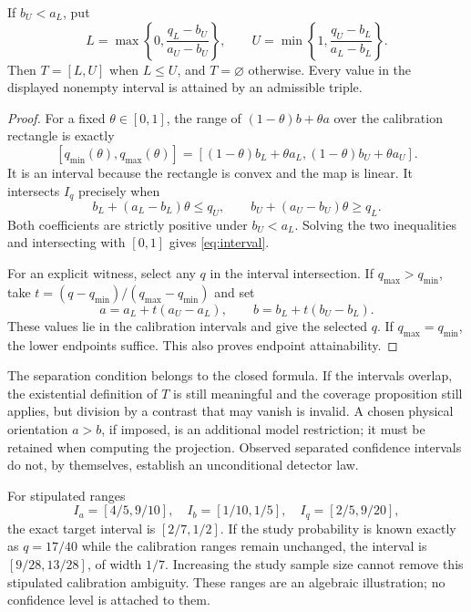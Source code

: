 \documentclass[11pt]{article}
\begin{document}
\begin{theorem}
If $b_U<a_L$, put
\begin{equation}
 L=\max\left\{0,\frac{q_L-b_U}{a_U-b_U}\right\},\qquad
 U=\min\left\{1,\frac{q_U-b_L}{a_L-b_L}\right\}.
 \label{eq:interval}
\end{equation}
Then $T=[L,U]$ when $L\le U$, and $T=\varnothing$ otherwise. Every value in the displayed nonempty interval is attained by an admissible triple.
\end{theorem}
\begin{proof}
For a fixed $\theta\in[0,1]$, the range of $(1-\theta)b+\theta a$ over the calibration rectangle is exactly
\[
 [q_{\min}(\theta),q_{\max}(\theta)]
 =[(1-\theta)b_L+\theta a_L,
   (1-\theta)b_U+\theta a_U].
\]
It is an interval because the rectangle is convex and the map is linear. It intersects $I_q$ precisely when
\[
 b_L+(a_L-b_L)\theta\le q_U,
 \qquad b_U+(a_U-b_U)\theta\ge q_L.
\]
Both coefficients are strictly positive under $b_U<a_L$. Solving the two inequalities and intersecting with $[0,1]$ gives \eqref{eq:interval}.

For an explicit witness, select any $q$ in the interval intersection. If $q_{\max}>q_{\min}$, take $t=(q-q_{\min})/(q_{\max}-q_{\min})$ and set
\[
 a=a_L+t(a_U-a_L),\qquad b=b_L+t(b_U-b_L).
\]
These values lie in the calibration intervals and give the selected $q$. If $q_{\max}=q_{\min}$, the lower endpoints suffice. This also proves endpoint attainability.
\end{proof}

The separation condition belongs to the closed formula. If the intervals overlap, the existential definition of $T$ is still meaningful and the coverage proposition still applies, but division by a contrast that may vanish is invalid. A chosen physical orientation $a>b$, if imposed, is an additional model restriction; it must be retained when computing the projection. Observed separated confidence intervals do not, by themselves, establish an unconditional detector law.

\begin{example}
For stipulated ranges
\[
 I_a=[4/5,9/10],\quad I_b=[1/10,1/5],\quad I_q=[2/5,9/20],
\]
the exact target interval is $[2/7,1/2]$. If the study probability is known exactly as $q=17/40$ while the calibration ranges remain unchanged, the interval is $[9/28,13/28]$, of width $1/7$. Increasing the study sample size cannot remove this stipulated calibration ambiguity. These ranges are an algebraic illustration; no confidence level is attached to them.
\end{example}
\end{document}
